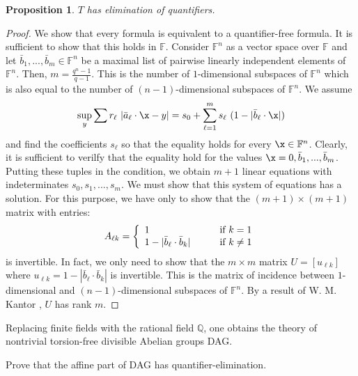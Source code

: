 \documentclass[12pt]{article}
\newtheorem{proposition}[theorem]{Proposition}
\def\a{\bar{a}}\def\b{\bar{b}}\def\c{\bar{c}}
\begin{document}
\begin{proposition} \label{qe}
$T$ has elimination of quantifiers.
\end{proposition}
\begin{proof}
We show that every formula is equivalent to a quantifier-free formula.
It is sufficient to show that this holds in $\mathbb F$.
Consider $\mathbb F^n$ as a vector space over $\mathbb F$ and let $\b_1,...,\b_m\in\mathbb F^n$
be a maximal list of pairwise linearly independent elements of $\mathbb F^n$.
Then, $m=\frac{q^n-1}{q-1}$. This is the number of $1$-dimensional subspaces of $\mathbb F^n$ which
is also equal to the number of $(n-1)$-dimensional subspaces of $\mathbb F^n$. We assume
$$\sup_y\sum r_\ell\ |\a_\ell\cdot\x-y|=s_0+\sum_{\ell=1}^m s_\ell\ (1-|\b_\ell\cdot\x|)$$
and find the coefficients $s_\ell$ so that the equality holds for every $\x\in\mathbb F^n$.
Clearly, it is sufficient to verilfy that the equality hold for the values $\x=0,\b_1,...,\b_m$.
Putting these tuples in the condition, we obtain $m+1$ linear equations with
indeterminates $s_0,s_1,...,s_{m}$. We must show that this system of equations has a solution.
For this purpose, we have only to show that the $(m+1)\times(m+1)$ matrix with entries:
\[ A_{\ell k}= \left\{
  \begin{array}{ll}
    1 \ \ \ & \hbox{if}\ k=1 \\
    1-|\b_\ell\cdot\b_k| \ \ \ \ \ \ & \hbox{if}\ k\neq 1
  \end{array}
\right.\]
is invertible. In fact, we only need to show that the $m\times m$ matrix
$U=[u_{\ell k}]$ where $u_{\ell k}=1-|\b_\ell\cdot\b_k|$ is invertible.
This is the matrix of incidence between $1$-dimensional and $(n-1)$-dimensional
subspaces of $\mathbb F^n$. By a result of W. M. Kantor \cite{W.Kantor}, $U$ has rank $m$.
\end{proof}

Replacing finite fields with the rational field $\mathbb Q$, one obtains the theory
of nontrivial torsion-free divisible Abelian groups DAG.
\bigskip

 Prove that the affine part of DAG has quantifier-elimination.
\end{document}
